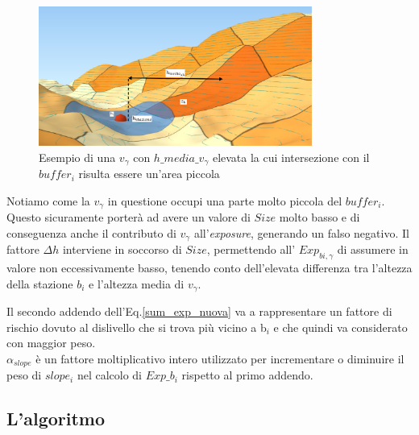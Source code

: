 \begin{figure}[bth]
  \centering
  \includegraphics[width=0.8\textwidth]{img/exDeltaH}
  \caption{Esempio di una $v_\gamma$ con $h\_media\_v_{\gamma}$ elevata la cui intersezione con il $buffer_i$ risulta essere un'area piccola } 
  \label{fig:exHmediaAlta}
\end{figure}

Notiamo come la $v_\gamma$ in questione occupi una parte molto piccola del $buffer_i$. Questo sicuramente porterà ad avere un valore di $Size$ molto basso e di conseguenza anche il contributo di $v_\gamma$ all'\textit{exposure}, generando un falso negativo. Il fattore $\Delta{h}$ interviene in soccorso di $Size$, permettendo all' $Exp_{bi,\gamma}$ di assumere in valore non eccessivamente basso, tenendo conto dell'elevata differenza tra l'altezza della stazione $b_i$ e l'altezza media di $v_\gamma$.

Il secondo addendo dell'Eq.\ref{sum_exp_nuova} va a rappresentare un fattore di rischio dovuto al dislivello che si trova più vicino a b$_i$ e che quindi va considerato con maggior peso.\\ 
$\alpha_{slope}$ è un fattore moltiplicativo intero utilizzato per incrementare o diminuire il peso  di $slope_i$ nel calcolo di $Exp\_b_i$ rispetto al primo addendo.\\ 

 


\subsection{L'algoritmo}

